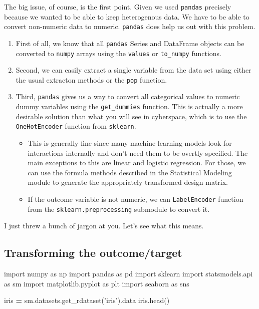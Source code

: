 \documentclass[
  letterpaper,
]{scrbook}
\newenvironment{Shaded}{\begin{snugshade}}{\end{snugshade}}
\newcommand{\ImportTok}[1]{#1}
\newcommand{\NormalTok}[1]{#1}
\newcommand{\OperatorTok}[1]{\textcolor[rgb]{0.81,0.36,0.00}{\textbf{#1}}}
\newcommand{\StringTok}[1]{\textcolor[rgb]{0.31,0.60,0.02}{#1}}
\providecommand{\tightlist}{%
  \setlength{\itemsep}{0pt}\setlength{\parskip}{0pt}}
\begin{document}
The big issue, of course, is the first point. Given we used \texttt{pandas} precisely because we wanted to be able to keep heterogenous data. We have to be able to convert non-numeric data to numeric. \texttt{pandas} does help us out with this problem.

\begin{enumerate}
\def\labelenumi{\arabic{enumi}.}
\tightlist
\item
  First of all, we know that all \texttt{pandas} Series and DataFrame objects can be converted to \texttt{numpy} arrays using the \texttt{values} or \texttt{to\_numpy} functions.
\item
  Second, we can easily extract a single variable from the data set using either the usual extracton methods or the
  \texttt{pop} function.
\item
  Third, \texttt{pandas} gives us a way to convert all categorical values to numeric dummy variables using the \texttt{get\_dummies} function. This is actually a more desirable solution than what you will see in cyberspace, which is to use the
  \texttt{OneHotEncoder} function from \texttt{sklearn}.

  \begin{itemize}
  \tightlist
  \item
    This is generally fine since many machine learning models look for interactions internally and don't need them to be overtly specified. The main exceptions to this are linear and logistic regression. For those, we can use the formula methods described in the Statistical Modeling module to generate the appropriately transformed design matrix.
  \item
    If the outcome variable is not numeric, we can \texttt{LabelEncoder} function from the \texttt{sklearn.preprocessing} submodule to convert it.
  \end{itemize}
\end{enumerate}

I just threw a bunch of jargon at you. Let's see what this means.

\hypertarget{transforming-the-outcometarget}{%
\subsection{Transforming the outcome/target}\label{transforming-the-outcometarget}}

\begin{Shaded}
\begin{Highlighting}[]
\ImportTok{import}\NormalTok{ numpy }\ImportTok{as}\NormalTok{ np}
\ImportTok{import}\NormalTok{ pandas }\ImportTok{as}\NormalTok{ pd}
\ImportTok{import}\NormalTok{ sklearn}
\ImportTok{import}\NormalTok{ statsmodels.api }\ImportTok{as}\NormalTok{ sm}
\ImportTok{import}\NormalTok{ matplotlib.pyplot }\ImportTok{as}\NormalTok{ plt}
\ImportTok{import}\NormalTok{ seaborn }\ImportTok{as}\NormalTok{ sns}

\NormalTok{iris }\OperatorTok{=}\NormalTok{ sm.datasets.get_rdataset(}\StringTok{'iris'}\NormalTok{).data}
\NormalTok{iris.head()}
\end{Highlighting}
\end{Shaded}
\end{document}
